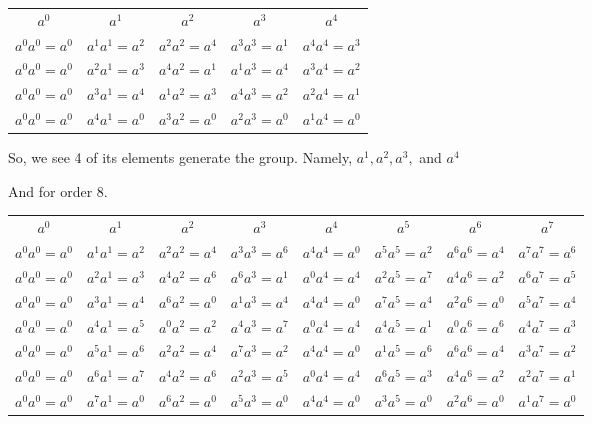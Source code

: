 \documentclass[12pt,letterpaper]{article}
\begin{document}
\begin{enumerate}
\begin{enumerate}
          \begin{tabular}{| c | c | c | c | c |}
            \hline
            $a^0$          & $a^1$          & $a^2$          & $a^3$          & $a^4$          \\
            $a^0a^0 = a^0$ & $a^1a^1 = a^2$ & $a^2a^2 = a^4$ & $a^3a^3 = a^1$ & $a^4a^4 = a^3$ \\
            $a^0a^0 = a^0$ & $a^2a^1 = a^3$ & $a^4a^2 = a^1$ & $a^1a^3 = a^4$ & $a^3a^4 = a^2$ \\
            $a^0a^0 = a^0$ & $a^3a^1 = a^4$ & $a^1a^2 = a^3$ & $a^4a^3 = a^2$ & $a^2a^4 = a^1$ \\
            $a^0a^0 = a^0$ & $a^4a^1 = a^0$ & $a^3a^2 = a^0$ & $a^2a^3 = a^0$ & $a^1a^4 = a^0$ \\
            \hline
          \end{tabular}

          So, we see 4 of its elements generate the group.
          Namely, $a^1, a^2, a^3,$ and $a^4$

          And for order 8.

          \begin{tabular}{| c | c | c | c | c | c | c | c |}
            \hline
            $a^0$          & $a^1$          & $a^2$          & $a^3$          & $a^4$          & $a^5$          & $a^6$          & $a^7$          \\
            $a^0a^0 = a^0$ & $a^1a^1 = a^2$ & $a^2a^2 = a^4$ & $a^3a^3 = a^6$ & $a^4a^4 = a^0$ & $a^5a^5 = a^2$ & $a^6a^6 = a^4$ & $a^7a^7 = a^6$ \\
            $a^0a^0 = a^0$ & $a^2a^1 = a^3$ & $a^4a^2 = a^6$ & $a^6a^3 = a^1$ & $a^0a^4 = a^4$ & $a^2a^5 = a^7$ & $a^4a^6 = a^2$ & $a^6a^7 = a^5$ \\
            $a^0a^0 = a^0$ & $a^3a^1 = a^4$ & $a^6a^2 = a^0$ & $a^1a^3 = a^4$ & $a^4a^4 = a^0$ & $a^7a^5 = a^4$ & $a^2a^6 = a^0$ & $a^5a^7 = a^4$ \\
            $a^0a^0 = a^0$ & $a^4a^1 = a^5$ & $a^0a^2 = a^2$ & $a^4a^3 = a^7$ & $a^0a^4 = a^4$ & $a^4a^5 = a^1$ & $a^0a^6 = a^6$ & $a^4a^7 = a^3$ \\
            $a^0a^0 = a^0$ & $a^5a^1 = a^6$ & $a^2a^2 = a^4$ & $a^7a^3 = a^2$ & $a^4a^4 = a^0$ & $a^1a^5 = a^6$ & $a^6a^6 = a^4$ & $a^3a^7 = a^2$ \\
            $a^0a^0 = a^0$ & $a^6a^1 = a^7$ & $a^4a^2 = a^6$ & $a^2a^3 = a^5$ & $a^0a^4 = a^4$ & $a^6a^5 = a^3$ & $a^4a^6 = a^2$ & $a^2a^7 = a^1$ \\
            $a^0a^0 = a^0$ & $a^7a^1 = a^0$ & $a^6a^2 = a^0$ & $a^5a^3 = a^0$ & $a^4a^4 = a^0$ & $a^3a^5 = a^0$ & $a^2a^6 = a^0$ & $a^1a^7 = a^0$ \\
            \hline
          \end{tabular}


\end{enumerate}
\end{enumerate}
\end{document}
